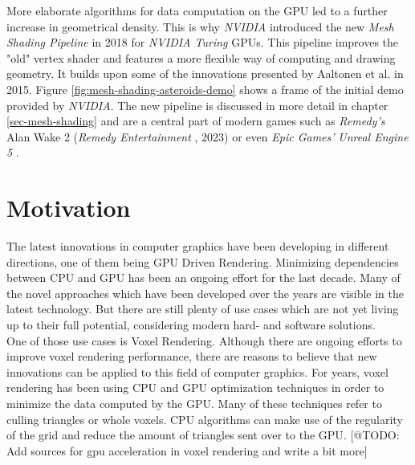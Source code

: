 \noindent
More elaborate algorithms for data computation on the \ac{GPU} led to a further increase in geometrical density.
This is why \emph{NVIDIA} introduced the new \emph{Mesh Shading Pipeline} in 2018 for \emph{NVIDIA Turing} \ac{GPU}s.
This pipeline improves the "old" vertex shader and features a more flexible way of computing and drawing geometry. 
It builds upon some of the innovations presented by Aaltonen et al.  \cite{Aaltonen2015} in 2015. Figure 
\ref{fig:mesh-shading-asteroids-demo} shows a frame of the initial demo provided by \emph{NVIDIA}. The new pipeline is 
discussed in more detail in chapter \ref{sec-mesh-shading} and are a central part of modern games such as \emph{Remedy's}
Alan Wake 2 (\emph{Remedy Entertainment} \cite{AlanWake22023}, 2023) or even \emph{Epic Games'} \emph{Unreal Engine 5} 
\cite{Karis2021}. 


\section{Motivation} \label{sec-motivation}

The latest innovations in computer graphics have been developing in different directions,
one of them being \ac{GPU} Driven Rendering. Minimizing dependencies between \ac{CPU} and \ac{GPU} 
has been an ongoing effort for the last decade. Many of the novel approaches which have been developed 
over the years are visible in the latest technology. But there are still plenty of use cases which are 
not yet living up to their full potential, considering modern hard- and software solutions.\\

\noindent 
One of those use cases is Voxel Rendering. Although there are ongoing efforts to improve voxel 
rendering performance, there are reasons to believe that new innovations can be applied to this 
field of computer graphics. For years, voxel rendering has been using \ac{CPU} and \ac{GPU} 
optimization techniques in order to minimize the data computed by the \ac{GPU}. Many of these 
techniques refer to culling triangles or whole voxels. \ac{CPU} algorithms can make use of the 
regularity of the grid and reduce the amount of triangles sent over to the \ac{GPU}. 
[@TODO: Add sources for gpu acceleration in voxel rendering and write a bit more] \\

